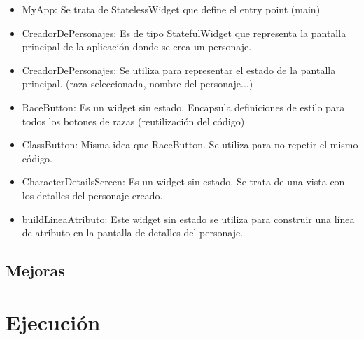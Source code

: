 \documentclass{article}
\begin{document}
\begin{itemize}[label=-]

\item MyApp: 
Se trata de StatelessWidget que define el entry point (main)

\item CreadorDePersonajes: 
Es de tipo StatefulWidget que representa la pantalla principal de la aplicación donde se crea un personaje. 

\item \textunderscore{}CreadorDePersonajes: 
    Se utiliza para representar el estado de la pantalla principal. (raza seleccionada, nombre del personaje...)

\item RaceButton:
    Es un widget sin estado. Encapsula definiciones de estilo para todos los botones de razas (reutilización del código)

\item ClassButton: 
    Misma idea que RaceButton. Se utiliza para no repetir el mismo código.

\item CharacterDetailsScreen: 
    Es un widget sin estado. Se trata de una vista con los detalles del personaje creado.
    

\item buildLineaAtributo:
    Este widget sin estado  se utiliza para construir una línea de atributo en la pantalla de detalles del personaje.

\end{itemize}

\subsection{Mejoras}



\newpage
\section{Ejecución}
\end{document}
